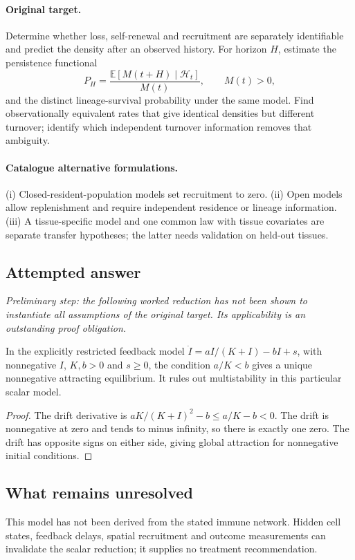 \documentclass[11pt]{article}
\begin{document}
\paragraph{Original target.}
Determine whether loss, self-renewal and recruitment are separately identifiable and predict the density after an observed history. For horizon $H$, estimate the persistence functional
    \[P_H=\frac{\mathbb{E}[M(t+H)\mid\mathcal H_t]}{M(t)},\qquad M(t)>0,\]
    and the distinct lineage-survival probability under the same model. Find observationally equivalent rates that give identical densities but different turnover; identify which independent turnover information removes that ambiguity.
\paragraph{Catalogue alternative formulations.}
(i) Closed-resident-population models set recruitment to zero. (ii) Open models allow replenishment and require independent residence or lineage information. (iii) A tissue-specific model and one common law with tissue covariates are separate transfer hypotheses; the latter needs validation on held-out tissues.
\subsection{Attempted answer}
\noindent\emph{Preliminary step: the following worked reduction has not been shown to instantiate all assumptions of the original target. Its applicability is an outstanding proof obligation.}

\begin{proposition}
In the explicitly restricted feedback model $\dot I=aI/(K+I)-bI+s$, with nonnegative $I$, $K,b>0$ and $s\geq0$, the condition $a/K<b$ gives a unique nonnegative attracting equilibrium. It rules out multistability in this particular scalar model.
\end{proposition}
\begin{proof}
The drift derivative is $aK/(K+I)^2-b\leq a/K-b<0$. The drift is nonnegative at zero and tends to minus infinity, so there is exactly one zero. The drift has opposite signs on either side, giving global attraction for nonnegative initial conditions.
\end{proof}
\subsection{What remains unresolved}
This model has not been derived from the stated immune network. Hidden cell states, feedback delays, spatial recruitment and outcome measurements can invalidate the scalar reduction; it supplies no treatment recommendation.
\end{document}
